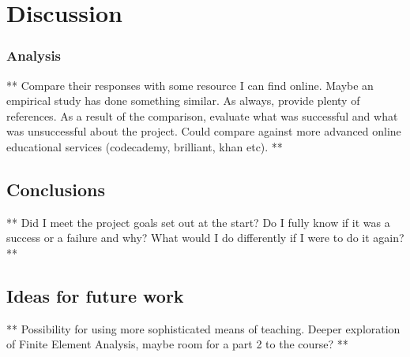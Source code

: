 \chapter{Discussion}
\label{chapter4}


\subsection{Analysis}
** Compare their responses with some resource I can find online. Maybe an empirical study has done something similar. As always, provide plenty of references. As a result of the comparison, evaluate what was successful and what was unsuccessful about the project. Could compare against more advanced online educational services (codecademy, brilliant, khan etc). ** 

\section{Conclusions}

** Did I meet the project goals set out at the start? Do I fully know if it was a success or a failure and why? What would I do differently if I were to do it again? **

\section{Ideas for future work}

** Possibility for using more sophisticated means of teaching. Deeper exploration of Finite Element Analysis, maybe room for a part 2 to the course? **